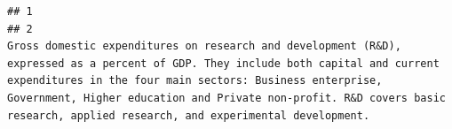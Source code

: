 \documentclass[
]{article}
\begin{document}
\begin{verbatim}
## 1                                                                                                                                                                                                                                                                                                                                                                                                                                                                                                                                                                                                                                                                                                                                                                                                                                                                                                                                                                                                                                                                                                                                                                                                                                                                                                                                                                                                                                                   
## 2                                                                                                                                                                                                                                                                                                                                                                                                                                                                                                                                                                                                                                                                                                                                                                                                                                                                                                                                                                                                                                                                                                                    Gross domestic expenditures on research and development (R&D), expressed as a percent of GDP. They include both capital and current expenditures in the four main sectors: Business enterprise, Government, Higher education and Private non-profit. R&D covers basic research, applied research, and experimental development.

\end{verbatim}
\end{document}

